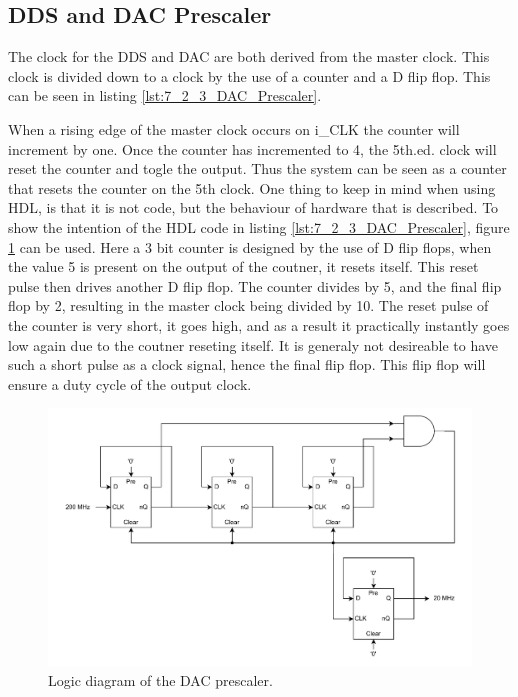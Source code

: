 \subsection*{DDS and DAC Prescaler}
The clock for the DDS and DAC are both derived from the  master clock. This clock is divided down to a  clock by the use of a counter and a D flip flop. This can be seen in listing \ref{lst:7_2_3_DAC_Prescaler}. 



When a rising edge of the master clock occurs on i\_CLK the counter will increment by one. Once the counter has incremented to 4, the 5th.ed. clock will reset the counter and togle the output. Thus the system can be seen as a counter that resets the counter on the 5th clock. One thing to keep in mind when using HDL, is that it is not code, but the behaviour of hardware that is described. To show the intention of the HDL code in listing \ref{lst:7_2_3_DAC_Prescaler}, figure \ref{fig:7_2_3_DAC_PRESCALER_LOGIC} can be used. Here a 3 bit counter is designed by the use of D flip flops, when the value 5 is present on the output of the coutner, it resets itself. This reset pulse then drives another D flip flop. The counter divides by 5, and the final flip flop by 2, resulting in the master clock being divided by 10. The reset pulse of the counter is very short, it goes high, and as a result it practically instantly goes low again due to the coutner reseting itself. It is generaly not desireable to have such a short pulse as a clock signal, hence the final flip flop. This flip flop will ensure a  duty cycle of the output clock.

\begin{figure}[H]
    \centering
    \includegraphics[clip, trim=0 0 0 0, width=1\textwidth]{Sections/7_SystemDesign/Figures/DAC_PRESCALER_LOGIC.pdf}
    \caption{Logic diagram of the DAC prescaler.}
    \label{fig:7_2_3_DAC_PRESCALER_LOGIC}
\end{figure}


